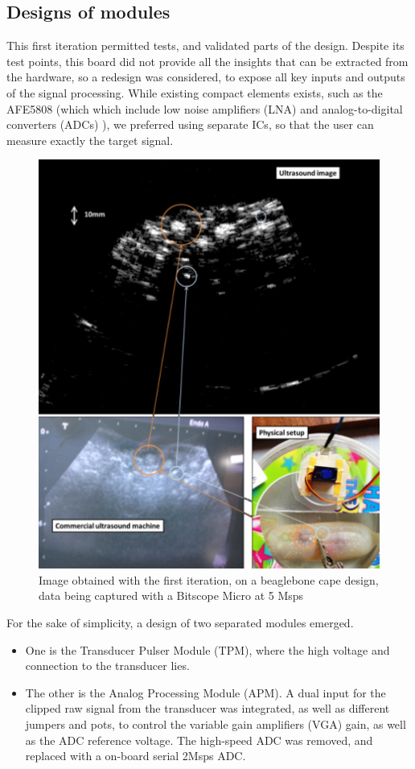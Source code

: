 \documentclass[letterpaper, 10 pt, conference]{ieeeconf} %
\begin{document}
\subsection{Designs of modules}

This first iteration permitted tests, and validated parts of the design. Despite its test points, this board did not provide all the insights that can be extracted from the hardware, so a redesign was considered, to expose all key inputs and outputs of the signal processing. While existing compact elements exists, such as the AFE5808 (which which include low noise amplifiers (LNA) and analog-to-digital converters (ADCs) )\cite{c8}, we preferred using separate ICs, so that the user can measure exactly the target signal.

\begin{figure}%
\centering
\includegraphics[width=.8\linewidth]{3in1}
\caption{Image obtained with the first iteration, on a beaglebone cape design, data being captured with a Bitscope Micro at 5 Msps}
\label{fig:single}
\end{figure}

For the sake of simplicity, a design of two separated modules emerged.

\begin{itemize} 
\item One is the Transducer Pulser Module (TPM), where the high voltage and connection to the transducer lies.
\item The other is the Analog Processing Module (APM). A dual input for the clipped raw signal from the transducer was integrated, as well as different jumpers and pots, to control the variable gain amplifiers (VGA) gain, as well as the ADC reference voltage. The high-speed ADC was removed, and replaced with a on-board serial 2Msps ADC.
\end{itemize}
\end{document}
